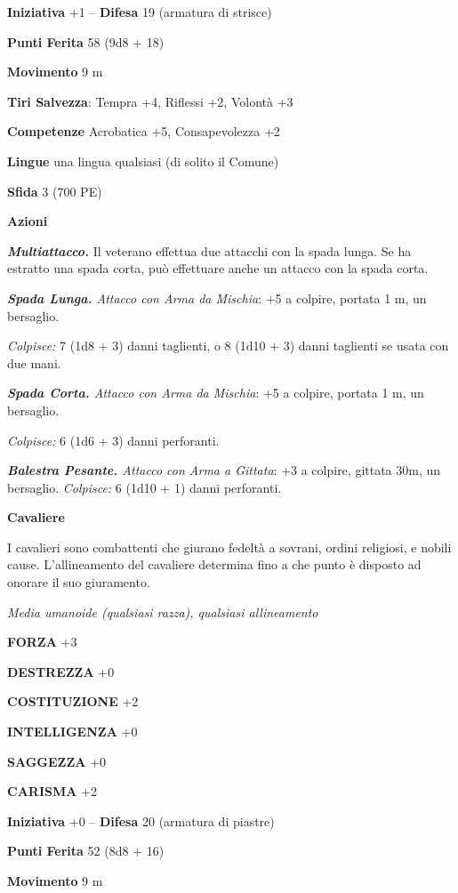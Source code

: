 \begin{multicols}{2}
\textbf{Iniziativa} +1 -- \textbf{Difesa} 19 (armatura di strisce)

\textbf{Punti Ferita} 58 (9d8 + 18)

\textbf{Movimento} 9 m

\textbf{Tiri Salvezza}: Tempra +4, Riflessi +2, Volontà +3 

\textbf{Competenze} Acrobatica +5, Consapevolezza +2

\textbf{Lingue} una lingua qualsiasi (di solito il Comune)

\textbf{Sfida} 3 (700 PE)

\textbf{Azioni}

\emph{\textbf{Multiattacco.}} Il veterano effettua due attacchi con la spada lunga. Se ha estratto una spada corta, può effettuare anche un attacco con la spada corta.

\emph{\textbf{Spada Lunga.} Attacco con Arma da Mischia}: +5 a colpire, portata 1 m, un bersaglio.

\emph{Colpisce:} 7 (1d8 + 3) danni taglienti, o 8 (1d10 + 3) danni taglienti se usata con due mani.

\emph{\textbf{Spada Corta.} Attacco con Arma da Mischia}: +5 a colpire, portata 1 m, un bersaglio.

\emph{Colpisce:} 6 (1d6 + 3) danni perforanti.

\emph{\textbf{Balestra Pesante.} Attacco con Arma a Gittata}: +3 a colpire, gittata 30m, un bersaglio. \emph{Colpisce:} 6 (1d10 + 1) danni perforanti.

\medskip\textbf{Cavaliere}

I cavalieri sono combattenti che giurano fedeltà a sovrani, ordini religiosi, e nobili cause. L'allineamento del cavaliere determina fino a che punto è disposto ad onorare il suo giuramento.

\emph{Media umanoide (qualsiasi razza), qualsiasi allineamento}

\textbf{FORZA} +3

\textbf{DESTREZZA} +0

\textbf{COSTITUZIONE} +2

\textbf{INTELLIGENZA} +0

\textbf{SAGGEZZA} +0

\textbf{CARISMA} +2

\textbf{Iniziativa} +0 -- \textbf{Difesa} 20 (armatura di piastre)

\textbf{Punti Ferita} 52 (8d8 + 16)

\textbf{Movimento} 9 m


\end{multicols}
